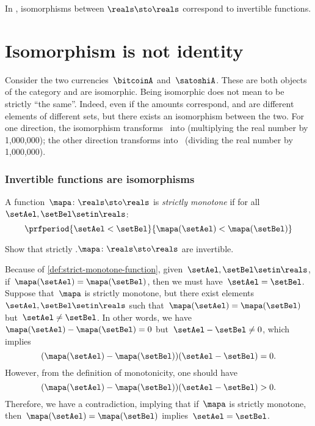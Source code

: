 \begin{example}
    In \Set, isomorphisms between $\reals\sto \reals$ correspond to invertible functions.
\end{example}

\section{Isomorphism is not identity}
\begin{example}
    Consider the two currencies~$\bitcoinA$ and~$\satoshiA$.
    These are both objects of the category \Curr and are isomorphic.
    Being isomorphic does not mean to be strictly ``the same''.
    Indeed, even if the amounts correspond, \unit[1]{\bitcoinA} and \unit[1,000,000]{\satoshiA} are different elements of different sets, but there exists an isomorphism between the two.
    For one direction, the isomorphism transforms \bitcoinA \ into \satoshiA (multiplying the real number by 1,000,000);
    the other direction transforms \satoshiA into \bitcoinA \ (dividing the real number by 1,000,000).
\end{example}

\subsubsection{Invertible functions are isomorphisms}
\begin{definition}
    \label{def:strict-monotone-function}
    A function~$\mapa\colon \reals \sto \reals$ is \emph{strictly monotone} if for all~$\setAel,\setBel\setin \reals$:
    \begin{equation}
        \prfperiod{\setAel < \setBel}{\mapa(\setAel)<\mapa(\setBel)}
    \end{equation}
\end{definition}
\begin{exercise}
    Show that strictly .$\mapa\colon \reals \sto \reals$ are invertible.
\end{exercise}
\begin{solution}
    Because of \cref{def:strict-monotone-function}, given~$\setAel,\setBel\setin \reals$, if~$\mapa(\setAel)=\mapa(\setBel)$, then we must have~$\setAel=\setBel$.
    Suppose that~$\mapa$ is strictly monotone, but there exist elements~$\setAel,\setBel\setin \reals$ such that~$\mapa(\setAel)=\mapa(\setBel)$ but~$\setAel\neq \setBel$.
    In other words, we have~$\mapa(\setAel)-\mapa(\setBel)=0$ but~$\setAel-\setBel\neq 0$, which implies
    \begin{equation}
        (\mapa(\setAel)-\mapa(\setBel))(\setAel-\setBel)=0.
    \end{equation}
    However, from the definition of monotonicity, one should have
    \begin{equation}
        (\mapa(\setAel)-\mapa(\setBel))(\setAel-\setBel)>0.
    \end{equation}
    Therefore, we have a contradiction, implying that if~$\mapa$ is strictly monotone, then~$\mapa(\setAel)=\mapa(\setBel)$ implies~$\setAel=\setBel$.
\end{solution}

